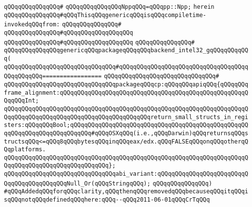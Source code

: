 \verb|qQQqqQQqqQQqqQQq#|\newline
\verb|qQQqqQQqqQQqqQQqNppqQQq=qQQqpp::Npp;|\newline
\verb|herein|\newline
\newline
\verb|qQQqqQQqqQQqqQQq#qQQqThisqQQqgenericqQQqisqQQqcompiletime-invokedqQQqfrom:|\newline
\verb|qQQqqQQqqQQqqQQq#|\newline
\verb|qQQqqQQqqQQqqQQq#qQQqqQQqqQQqqQQqqQQq|\newline
\verb|qQQqqQQqqQQqqQQq#qQQqqQQqqQQqqQQqqQQq|\newline
\verb|qQQqqQQqqQQqqQQq#|\newline
\verb|qQQqqQQqqQQqqQQqgenericqQQqpackageqQQqqQQqbackend_intel32_gqQQqqQQqqQQq(|\newline
\verb|qQQqqQQqqQQqqQQqqQQqqQQqqQQqqQQq#qQQqqQQqqQQqqQQqqQQqqQQqqQQqqQQqqQQqqQQqqQQqqQQq=================|\newline
\verb|qQQqqQQqqQQqqQQqqQQqqQQqqQQqqQQq#|\newline
\verb|qQQqqQQqqQQqqQQqqQQqqQQqqQQqqQQqpackageqQQqcp:qQQqqQQqapiqQQq{qQQqqQQqframe_alignment:qQQqqQQqqQQqqQQqqQQqqQQqqQQqqQQqqQQqqQQqqQQqqQQqqQQqqQQqqQQqInt;|\newline
\verb|qQQqqQQqqQQqqQQqqQQqqQQqqQQqqQQqqQQqqQQqqQQqqQQqqQQqqQQqqQQqqQQqqQQqqQQqqQQqqQQqqQQqqQQqqQQqqQQqqQQqqQQqqQQqqQQqreturn_small_structs_in_registers:qQQqqQQqBool;qQQqqQQqqQQqqQQqqQQqqQQqqQQqqQQqqQQqqQQqqQQqqQQqqQQqqQQqqQQqqQQqqQQqqQQqqQQq#qQQqOSXqQQq(i.e.,qQQqDarwin)qQQqreturnsqQQqstructsqQQq<=qQQq8qQQqbytesqQQqinqQQqeax/edx.qQQqFALSEqQQqonqQQqotherqQQqplatforms.|\newline
\verb|qQQqqQQqqQQqqQQqqQQqqQQqqQQqqQQqqQQqqQQqqQQqqQQqqQQqqQQqqQQqqQQqqQQqqQQqqQQqqQQqqQQqqQQqqQQqqQQqqQQq};|\newline
\newline
\verb|qQQqqQQqqQQqqQQqqQQqqQQqqQQqqQQqabi_variant:qQQqqQQqqQQqqQQqqQQqqQQqqQQqqQQqqQQqqQQqqQQqNull_Or(qQQqStringqQQq);|\newline
\verb|qQQqqQQqqQQqqQQq)|\newline
\verb|#qQQqAddedqQQqforqQQqclarity,qQQqthenqQQqremovedqQQqbecauseqQQqitqQQqisqQQqnotqQQqdefinedqQQqhere:qQQq--qQQq2011-06-01qQQqCrTqQQq|\newline
